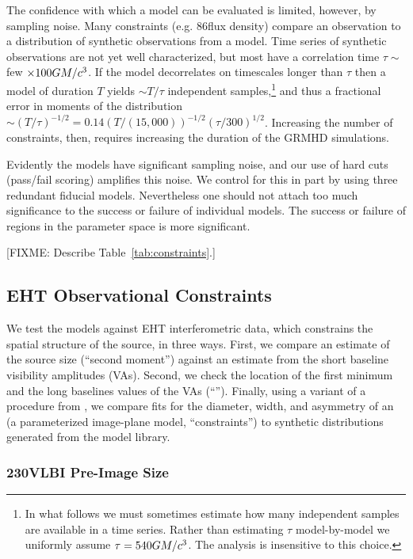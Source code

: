 The confidence with which a model can be evaluated is limited, however, by sampling noise.  Many constraints (e.g. 86\GHz flux density) compare an observation to a distribution of synthetic observations from a model.  Time series of synthetic observations are not yet well characterized, but most have a correlation time $\tau\sim$ few $\times 100 GM/c^3$.  If the model decorrelates on timescales longer than $\tau$ then a model of duration $T$ yields $\sim T/\tau$ independent samples,\footnote{In what follows we must sometimes estimate how many independent samples are available in a time series.  Rather than estimating $\tau$  model-by-model we uniformly assume $\tau = 540 GM/c^3$.  The analysis is insensitive to this choice.} and thus a fractional error in moments of the distribution $\sim (T/\tau)^{-1/2} = 0.14 (T/(15,000))^{-1/2}(\tau/300)^{1/2}$.  Increasing the number of constraints, then, requires increasing the duration of the GRMHD simulations.

Evidently the models have significant sampling noise, and our use of hard cuts (pass/fail scoring) amplifies this noise.  We control for this in part by using three redundant fiducial models.  Nevertheless one should not attach too much significance to the success or failure of individual models.  The success or failure of regions in the parameter space is more significant.

[FIXME: Describe Table~\ref{tab:constraints}.]

\subsection{EHT Observational Constraints}

We test the models against EHT interferometric data, which constrains the spatial structure of the source, in three ways.
First, we compare an estimate of the source size (``second moment'')
against an estimate from the short baseline visibility amplitudes (VAs).
Second, we check the location of the first minimum and the long
baselines values of the VAs (``\vam'').
Finally, using a variant of a procedure from , we
compare fits for the diameter, width, and asymmetry of an \mring (a parameterized image-plane model, ``\mring constraints'') to synthetic distributions generated from the model library.

\subsubsection{230\GHz VLBI Pre-Image Size}
\label{sec:sz}

